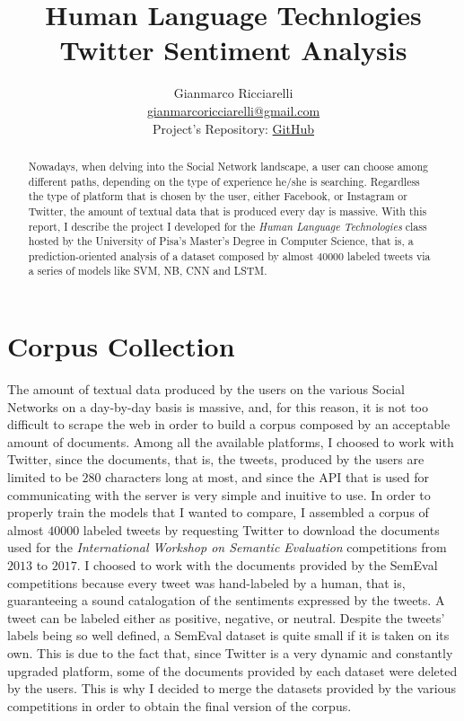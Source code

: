 \documentclass[11pt,twocolumn]{article}
\title{\textbf{Human Language Technlogies \\ Twitter Sentiment Analysis}}
\author{Gianmarco Ricciarelli \\ \href{mailto:gianmarcoricciarelli@gmail.com}{gianmarcoricciarelli@gmail.com}\\
Project's Repository: \href{https://github.com/germz01/twitter_sentiment_analysis}{GitHub}}
\date{}
\begin{document}
    \maketitle

    \begin{abstract}
        \noindent
        Nowadays, when delving into the Social Network landscape, a user can choose among different
        paths, depending on the type of experience he/she is searching. Regardless the type of platform that
        is chosen by the user, either Facebook, or Instagram or Twitter, the amount of textual data that is
        produced every day is massive. With this report, I describe the project I developed for the
        \textit{Human Language Technologies} class hosted by the University of Pisa's Master's Degree in
        Computer Science, that is, a prediction-oriented analysis of a dataset composed by almost $40000$
        labeled tweets via a series of models like SVM, NB, CNN and LSTM.
    \end{abstract}

    \section{Corpus Collection} %
    \label{sec:corpus_collection}
        The amount of textual data produced by the users on the various Social Networks on a day-by-day
        basis is massive, and, for this reason, it is not too difficult to scrape the web in order to
        build a corpus composed by an acceptable amount of documents. Among all the available platforms, I
        choosed to work with Twitter, since the documents, that is, the tweets, produced by the users are
        limited to be $280$ characters long at most, and since the API that is used for communicating with
        the server is very simple and inuitive to use. In order to properly train the models that I
        wanted to compare, I assembled a corpus of almost $40000$ labeled tweets by requesting Twitter to
        download the documents used for the \textit{International Workshop on Semantic Evaluation}
        competitions from $2013$ to $2017$. I choosed to work with the documents provided by the SemEval
        competitions because every tweet was hand-labeled by a human, that is, guaranteeing a sound
        catalogation of the sentiments expressed by the tweets. A tweet can be labeled either as
        positive, negative, or neutral. Despite the tweets' labels being so well defined, a SemEval
        dataset is quite small if it is taken on its own. This is due to the fact that, since Twitter is a
        very dynamic and constantly upgraded platform, some of the documents provided by each dataset
        were deleted by the users. This is why I decided to merge the datasets provided by the various
        competitions in order to obtain the final version of the corpus.
\end{document}
